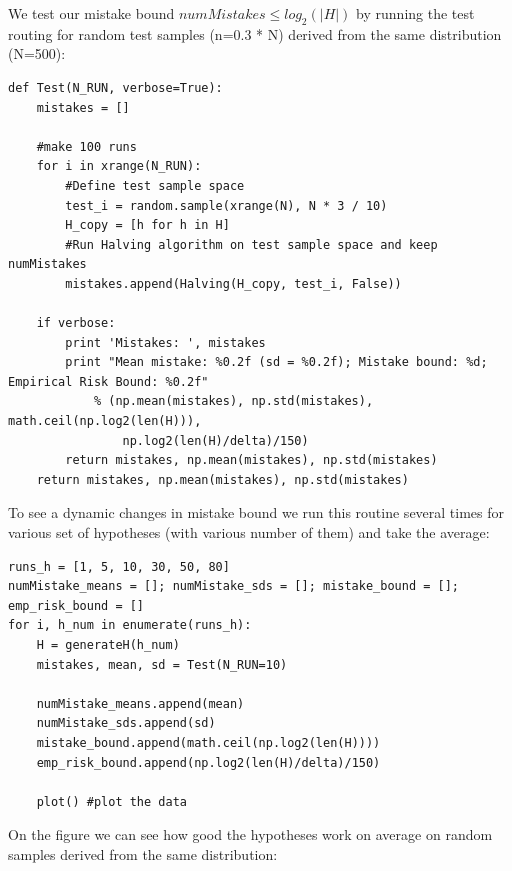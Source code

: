 \documentclass{article}
\begin{document}
We test our mistake bound $numMistakes \le log_2(|H|)$ by running the test routing for random test samples (n=0.3 * N) derived from the same distribution (N=500):
\begin{lstlisting}[frame=single]  
def Test(N_RUN, verbose=True):
	mistakes = []
	
	#make 100 runs
	for i in xrange(N_RUN):
		#Define test sample space
		test_i = random.sample(xrange(N), N * 3 / 10)
		H_copy = [h for h in H]		
		#Run Halving algorithm on test sample space and keep numMistakes
		mistakes.append(Halving(H_copy, test_i, False))
	
	if verbose:
		print 'Mistakes: ', mistakes
		print "Mean mistake: %0.2f (sd = %0.2f); Mistake bound: %d; Empirical Risk Bound: %0.2f"
			% (np.mean(mistakes), np.std(mistakes), math.ceil(np.log2(len(H))), 
				np.log2(len(H)/delta)/150)
		return mistakes, np.mean(mistakes), np.std(mistakes)
	return mistakes, np.mean(mistakes), np.std(mistakes)
\end{lstlisting}

To see a dynamic changes in mistake bound we run this routine several times for various set of hypotheses (with various number of them) and take the average:
\begin{lstlisting}[frame=single]  
runs_h = [1, 5, 10, 30, 50, 80]
numMistake_means = []; numMistake_sds = []; mistake_bound = []; emp_risk_bound = []
for i, h_num in enumerate(runs_h):
	H = generateH(h_num)
	mistakes, mean, sd = Test(N_RUN=10)
	
	numMistake_means.append(mean)
	numMistake_sds.append(sd)
	mistake_bound.append(math.ceil(np.log2(len(H))))
	emp_risk_bound.append(np.log2(len(H)/delta)/150)

	plot() #plot the data
\end{lstlisting}

On the figure we can see how good the hypotheses work on average on random samples derived from the same distribution: \pagebreak
     
\end{document}
